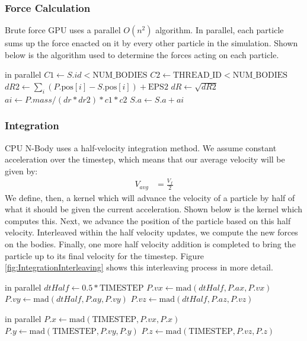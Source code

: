 \documentclass{thesis}
\begin{document}
\subsubsection{Force Calculation}
Brute force GPU uses a parallel $O(n^2)$ algorithm. In parallel, each particle sums up the force enacted on it by every other particle in the simulation. Shown below is the algorithm used to determine the forces acting on each particle.
\begin{algorithmic}
     in parallel
            \State $C1 \gets S.id < \text{NUM\_BODIES}$
            \State $C2 \gets \text{THREAD\_ID} < \text{NUM\_BODIES}$
            \State $dR2 \gets \sum_i (P.\text{pos}[i] - S.\text{pos}[i]) + \text{EPS2}$
            \State $dR \gets \sqrt{dR2}$
            \State $ai \gets P.mass/(dr*dr2) * c1 * c2$
            \State $S.a \gets S.a + ai$ 
        \EndFor
    \EndFor
\end{algorithmic}
\subsubsection{Integration}
CPU N-Body uses a half-velocity integration method. We assume constant acceleration over the timestep, which means that our average velocity will be given by:
\begin{align}
    V_{avg} &= \frac{V_f}{2}
\end{align}
We define, then, a kernel which will advance the velocity of a particle by half of what it should be given the current acceleration. Shown below is the kernel which computes this.
Next, we advance the position of the particle based on this half velocity.
Interleaved within the half velocity updates, we compute the new forces on the bodies. Finally, one more half velocity addition is completed to bring the particle up to its final velocity for the timestep. Figure \ref{fig:IntegrationInterleaving} shows this interleaving process in more detail.

\begin{algorithmic}
     in parallel
        \State $dtHalf \gets 0.5 * \text{TIMESTEP}$
        \State $P.vx \gets \text{mad}(dtHalf, P.ax, P.vx)$
        \State $P.vy \gets \text{mad}(dtHalf, P.ay, P.vy)$
        \State $P.vz \gets \text{mad}(dtHalf, P.az, P.vz)$
    \EndFor
\end{algorithmic}

\begin{algorithmic}
     in parallel
        \State $P.x \gets \text{mad}(\text{TIMESTEP}, P.vx, P.x)$
        \State $P.y \gets \text{mad}(\text{TIMESTEP}, P.vy, P.y)$
        \State $P.z \gets \text{mad}(\text{TIMESTEP}, P.vz, P.z)$
    \EndFor
\end{algorithmic}
\end{document}
